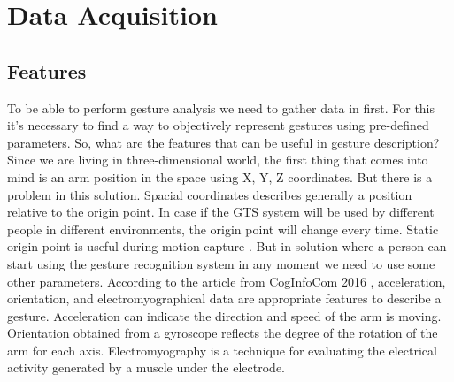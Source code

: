 \documentclass[conference,compsoc]{IEEEtran}
\begin{document}
\label{tab:examples}

\section{Data Acquisition}
\subsection{Features}
To be able to perform gesture analysis we need to gather data in first. For this it's necessary to find a way to objectively represent gestures using pre-defined parameters. So, what are the features that can be useful in gesture description? Since we are living in three-dimensional world, the first thing that comes into mind is an arm position in the space using X, Y, Z coordinates. But there is a problem in this solution. Spacial  coordinates describes generally a position relative to the origin point. In case if the GTS system will be used by different people in different environments, the origin point will change every time. Static origin point is useful during motion capture \cite{myo_mocap}. But in solution where a person can start using the gesture recognition system in any moment \cite{myo_game} we need to use some other parameters. According to the article from CogInfoCom 2016 \cite{gesture_control_capabilities}, acceleration, orientation, and electromyographical data are appropriate features to describe a gesture. Acceleration can indicate the direction and speed of the arm is moving. Orientation obtained from a gyroscope reflects the degree of the rotation of the arm for each axis. Electromyography is a technique for evaluating the electrical activity generated by a muscle under the electrode.
\end{document}
